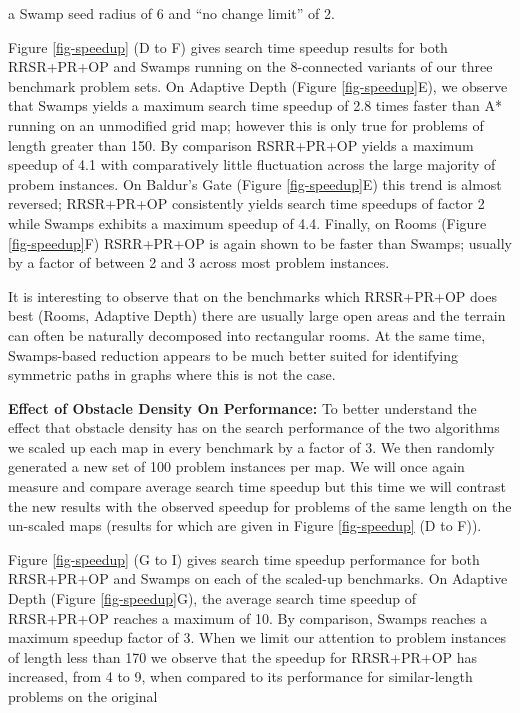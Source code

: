  a Swamp seed radius of 6 and ``no change limit'' of 2.
\par
Figure \ref{fig-speedup} (D to F) gives search time speedup results for both 
RRSR+PR+OP and Swamps running on the 8-connected variants of our three benchmark 
problem sets. 
On Adaptive Depth (Figure \ref{fig-speedup}E), we observe that 
Swamps yields a maximum search time speedup of 2.8 times faster than 
 A* running on an unmodified grid map; however this is only true for problems of length greater than 150.
By comparison RSRR+PR+OP yields a maximum speedup of 4.1 with comparatively little fluctuation across the
large majority of probem instances.
On Baldur's Gate (Figure \ref{fig-speedup}E) this trend is almost reversed; RRSR+PR+OP consistently 
yields search time speedups of factor 2 while Swamps exhibits a maximum speedup of 4.4.
Finally, on Rooms (Figure \ref{fig-speedup}F) RSRR+PR+OP is again shown to be faster than Swamps;
usually by a factor of between 2 and 3 across most problem instances.
\par
It is interesting to observe that on the benchmarks which RRSR+PR+OP does best (Rooms, Adaptive Depth) 
there are usually large open areas and the terrain can often be naturally decomposed into rectangular rooms.
At the same time, Swamps-based reduction appears to be much better suited for identifying symmetric paths 
in graphs where this is not the case.
\par
\textbf{Effect of Obstacle Density On Performance:}
To better understand the effect that obstacle density has on the search performance of the two algorithms
we scaled up each map in every benchmark by a factor of 3.
We then randomly generated a new set of 100 problem instances per map.
We will once again measure and compare average search time speedup but this time we will contrast the new
results with the observed speedup for problems of the same length on the un-scaled maps (results for
which are given in Figure \ref{fig-speedup} (D to F)).
\par
Figure \ref{fig-speedup} (G to I) gives search time speedup performance for both RRSR+PR+OP and Swamps
on each of the scaled-up benchmarks.
On Adaptive Depth (Figure \ref{fig-speedup}G), the average search time speedup of RRSR+PR+OP reaches a maximum of 10. 
By comparison, Swamps reaches a maximum speedup factor of 3.
When we limit our attention to problem instances of length less than 170 we observe that the speedup 
for RRSR+PR+OP has increased, from 4 to 9, when compared to its performance for similar-length problems on the original 

